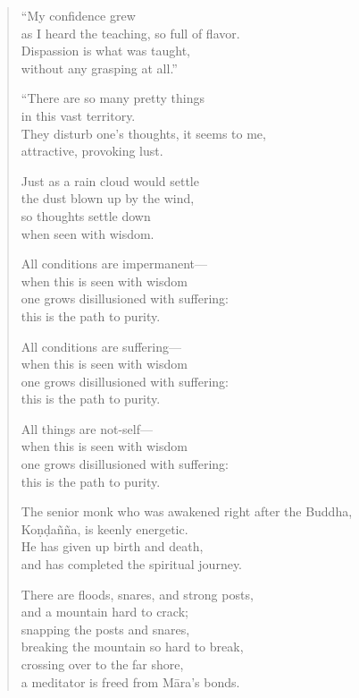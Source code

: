 \documentclass[12pt,openany]{book}%
\begin{document}
\begin{verse}%
“My confidence grew \\
as I heard the teaching, so full of flavor. \\
Dispassion is what was taught, \\
without any grasping at all.” 

“There are so many pretty things \\
in this vast territory. \\
They disturb one’s thoughts, it seems to me, \\
attractive, provoking lust. 

Just as a rain cloud would settle \\
the dust blown up by the wind, \\
so thoughts settle down \\
when seen with wisdom. 

All conditions are impermanent—\\
when this is seen with wisdom \\
one grows disillusioned with suffering: \\
this is the path to purity. 

All conditions are suffering—\\
when this is seen with wisdom \\
one grows disillusioned with suffering: \\
this is the path to purity. 

All things are not-self—\\
when this is seen with wisdom \\
one grows disillusioned with suffering: \\
this is the path to purity. 

The senior monk who was awakened right after the Buddha, \\
\textsanskrit{Koṇḍañña}, is keenly energetic. \\
He has given up birth and death, \\
and has completed the spiritual journey. 

There are floods, snares, and strong posts, \\
and a mountain hard to crack; \\
snapping the posts and snares, \\
breaking the mountain so hard to break, \\
crossing over to the far shore, \\
a meditator is freed from \textsanskrit{Māra}’s bonds. 


\end{verse}
\end{document}
